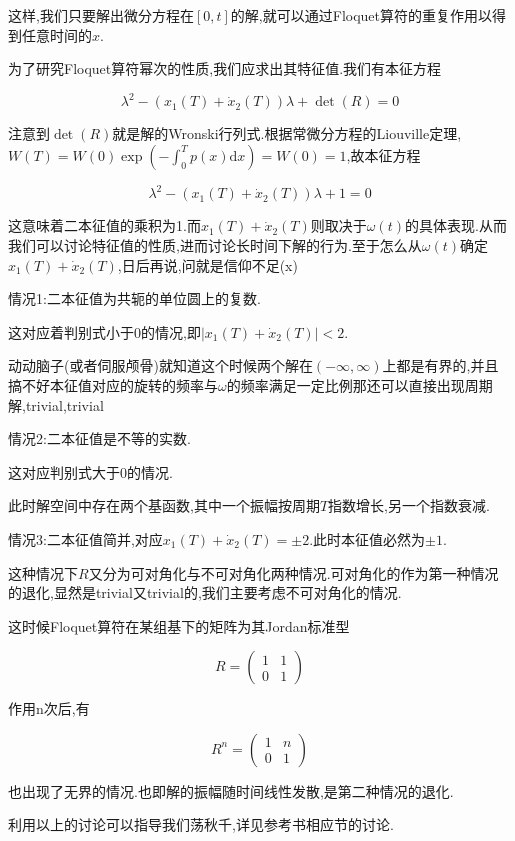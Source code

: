 \documentclass[UTF8]{article}
\newcommand{\D}{\mathrm{d}}
\begin{document}
	这样,我们只要解出微分方程在$[0,t]$的解,就可以通过Floquet算符的重复作用以得到任意时间的$x$.
	
	为了研究Floquet算符幂次的性质,我们应求出其特征值.我们有本征方程
	
	\[\lambda^2-(x_1(T)+\dot{x}_2(T))\lambda+\det(R)=0\]
	
	注意到$\det(R)$就是解的Wronski行列式.根据常微分方程的Liouville定理,$W(T)=W(0)\exp(-\int_{0}^{T}p(x)\D x)=W(0)=1$,故本征方程

	\[\lambda^2-(x_1(T)+\dot{x}_2(T))\lambda+1=0\]
	
	这意味着二本征值的乘积为1.而$x_1(T)+\dot{x}_2(T)$则取决于$\omega(t)$的具体表现.从而我们可以讨论特征值的性质,进而讨论长时间下解的行为.至于怎么从$\omega(t)$确定$x_1(T)+\dot{x}_2(T)$,日后再说,问就是信仰不足(x)
	
	情况1:二本征值为共轭的单位圆上的复数.
	
	这对应着判别式小于0的情况,即$|x_1(T)+\dot{x}_2(T)|<2$.
	
	动动脑子(或者伺服颅骨)就知道这个时候两个解在$(-\infty,\infty)$上都是有界的,并且搞不好本征值对应的旋转的频率与$\omega$的频率满足一定比例那还可以直接出现周期解,trivial,trivial
	
	情况2:二本征值是不等的实数.
	
	这对应判别式大于0的情况.
	
	此时解空间中存在两个基函数,其中一个振幅按周期$T$指数增长,另一个指数衰减.
	
	情况3:二本征值简并,对应$x_1(T)+\dot{x}_2(T)=\pm2$.此时本征值必然为$\pm 1$.
	
	这种情况下$R$又分为可对角化与不可对角化两种情况.可对角化的作为第一种情况的退化,显然是trivial又trivial的,我们主要考虑不可对角化的情况.
	
	这时候Floquet算符在某组基下的矩阵为其Jordan标准型
	
	\[R=\begin{pmatrix}1&1\\0&1\end{pmatrix}\]

	作用n次后,有
	
	\[R^n=\begin{pmatrix}1&n\\0&1\end{pmatrix}\]

	也出现了无界的情况.也即解的振幅随时间线性发散,是第二种情况的退化.
	
	利用以上的讨论可以指导我们荡秋千,详见参考书\cite{LiuChuan}相应节的讨论.
	
	\newpage
	
\end{document}
